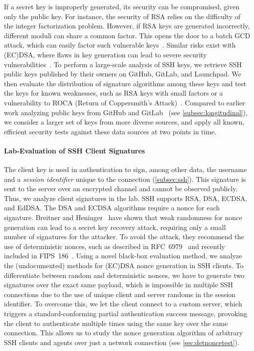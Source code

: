 If a secret key is improperly generated, its security can be compromised, given only the public key. For instance, the security of RSA relies on the difficulty of the integer factorization problem. However, if RSA keys are generated incorrectly, different moduli can share a common factor. This opens the door to a batch GCD attack, which can easily factor such vulnerable keys~\cite{bernstein2004find,USENIX:HDWH12}. Similar risks exist with (EC)DSA, where flaws in key generation can lead to severe security vulnerabilities~\cite{cve-2008-0166}. To perform a large-scale analysis of SSH keys, we retrieve SSH public keys published by their owners on GitHub, GitLab, and Launchpad. We then evaluate the distribution of signature algorithms among these keys and test the keys for known weaknesses, such as RSA keys with small factors or a vulnerability to ROCA (Return of Coppersmith's Attack)~\cite{CCS:NSSKM17}. Compared to earlier work analyzing public keys from GitHub and GitLab~\cite{cox2015,EPRINT:Bock23,barbulescu2016weakrsakeys,cryptosense2015,amiet2018} (see \autoref{subsec:longitudinal}), we consider a larger set of keys from more diverse sources, and apply all known, efficient security tests against these data sources at two points in time.

\paragraph{Lab-Evaluation of SSH Client Signatures}

The client key is used in authentication to sign, among other data, the username and a \emph{session identifier} unique to the connection (\autoref{subsec:ssh}). This signature is sent to the server over an encrypted channel and cannot be observed publicly. Thus, we analyze client signatures in the lab. SSH supports RSA, DSA, ECDSA, and EdDSA. The DSA and ECDSA algorithms require a nonce for each signature. Breitner and Heninger~\cite{FC:BreHen19} have shown that weak randomness for nonce generation can lead to a secret key recovery attack, requiring only a small number of signatures for the attacker. To avoid the attack, they recommend the use of deterministic nonces, such as described in RFC~6979~\cite{rfc6979} and recently included in FIPS~186~\cite{FIPS-186-5}. Using a novel black-box evaluation method, we analyze the (undocumented) methods for (EC)DSA nonce generation in SSH clients. To differentiate between random and deterministic nonces, we have to generate two signatures over the exact same payload, which is impossible in multiple SSH connections due to the use of unique client and server randoms in the session identifier. To overcome this, we let the client connect to a custom server, which triggers a standard-conforming partial authentication success message, provoking the client to authenticate multiple times using the same key over the same connection. This allows us to study the nonce generation algorithm of arbitrary SSH clients and agents over just a network connection (see \autoref{sec:detnoncetest}).

